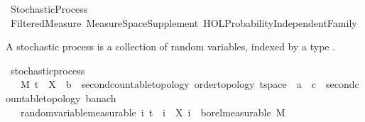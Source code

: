 %
\begin{isabellebody}%
%
%
\isadelimtheory
\isanewline
\isanewline
%
\endisadelimtheory
%
\isatagtheory
{}\isamarkupfalse%
\ Stochastic{\isacharunderscore}{\kern0pt}Process\isanewline
{}\ Filtered{\isacharunderscore}{\kern0pt}Measure\ Measure{\isacharunderscore}{\kern0pt}Space{\isacharunderscore}{\kern0pt}Supplement\ {\isachardoublequoteopen}HOL{\isacharminus}{\kern0pt}Probability{\isachardot}{\kern0pt}Independent{\isacharunderscore}{\kern0pt}Family{\isachardoublequoteclose}\isanewline
{}%
\endisatagtheory
{\isafoldtheory}%
%
\isadelimtheory
%
\endisadelimtheory
%
\isadelimdocument
%
\endisadelimdocument
%
\isatagdocument
%
\isamarkuptrue%
%
\isamarkuptrue%
%
\endisatagdocument
{\isafolddocument}%
%
\isadelimdocument
%
\endisadelimdocument
%
\begin{isamarkuptext}%
A stochastic process is a collection of random variables, indexed by a type .%
\end{isamarkuptext}\isamarkuptrue%
\isamarkupfalse%
\ stochastic{\isacharunderscore}{\kern0pt}process\ {\isacharequal}{\kern0pt}\isanewline
\ \ \ M\ t\ \ X\ {\isacharcolon}{\kern0pt}{\isacharcolon}{\kern0pt}\ {\isachardoublequoteopen}{\isacharprime}{\kern0pt}b\ {\isacharcolon}{\kern0pt}{\isacharcolon}{\kern0pt}\ {\isacharbraceleft}{\kern0pt}second{\isacharunderscore}{\kern0pt}countable{\isacharunderscore}{\kern0pt}topology{\isacharcomma}{\kern0pt}\ order{\isacharunderscore}{\kern0pt}topology{\isacharcomma}{\kern0pt}\ t{}{\isacharunderscore}{\kern0pt}space{\isacharbraceright}{\kern0pt}\ {\isasymRightarrow}\ {\isacharprime}{\kern0pt}a\ {\isasymRightarrow}\ {\isacharprime}{\kern0pt}c\ {\isacharcolon}{\kern0pt}{\isacharcolon}{\kern0pt}\ {\isacharbraceleft}{\kern0pt}second{\isacharunderscore}{\kern0pt}countable{\isacharunderscore}{\kern0pt}topology{\isacharcomma}{\kern0pt}\ banach{\isacharbraceright}{\kern0pt}{\isachardoublequoteclose}\isanewline
\ \ \ random{\isacharunderscore}{\kern0pt}variable{\isacharbrackleft}{\kern0pt}measurable{\isacharbrackright}{\kern0pt}{\isacharcolon}{\kern0pt}\ {\isachardoublequoteopen}{\isasymAnd}i{\isachardot}{\kern0pt}\ t\ {\isasymle}\ i\ {\isasymLongrightarrow}\ X\ i\ {\isasymin}\ borel{\isacharunderscore}{\kern0pt}measurable\ M{\isachardoublequoteclose}\isanewline

\end{isabellebody}
